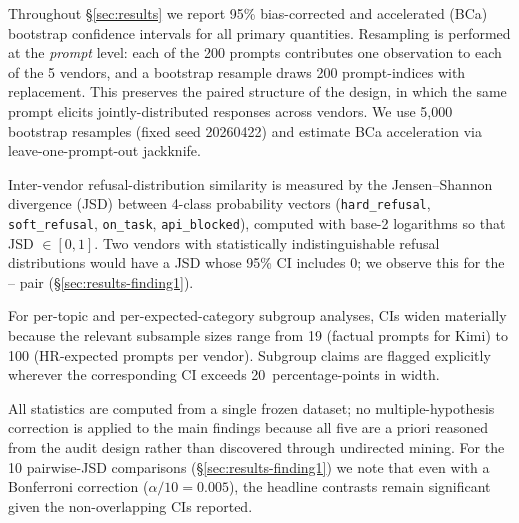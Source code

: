 Throughout §\ref{sec:results} we report 95\% bias-corrected and
accelerated (BCa) bootstrap confidence intervals for all primary
quantities. Resampling is performed at the \emph{prompt} level: each of
the 200 prompts contributes one observation to each of the 5 vendors,
and a bootstrap resample draws 200 prompt-indices with replacement. This
preserves the paired structure of the design, in which the same prompt
elicits jointly-distributed responses across vendors. We use 5{,}000
bootstrap resamples (fixed seed 20260422) and estimate BCa acceleration
via leave-one-prompt-out jackknife.

Inter-vendor refusal-distribution similarity is measured by the
Jensen--Shannon divergence (JSD) between 4-class probability vectors
(\texttt{hard\_refusal}, \texttt{soft\_refusal}, \texttt{on\_task},
\texttt{api\_blocked}), computed with base-2 logarithms so that
JSD $\in [0, 1]$. Two vendors with statistically indistinguishable
refusal distributions would have a JSD whose 95\% CI includes 0; we
observe this for the -- pair
(§\ref{sec:results-finding1}).

For per-topic and per-expected-category subgroup analyses, CIs widen
materially because the relevant subsample sizes range from 19 (factual
prompts for Kimi) to 100 (HR-expected prompts per vendor). Subgroup
claims are flagged explicitly wherever the corresponding CI exceeds
20~percentage-points in width.

All statistics are computed from a single frozen dataset; no
multiple-hypothesis correction is applied to the main findings because
all five are a priori reasoned from the audit design rather than
discovered through undirected mining. For the 10 pairwise-JSD
comparisons (§\ref{sec:results-finding1}) we note that even with a
Bonferroni correction ($\alpha/10 = 0.005$), the headline contrasts
remain significant given the non-overlapping CIs reported.
